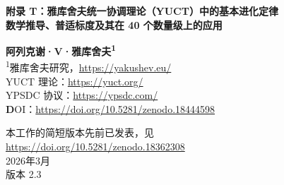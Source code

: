 \documentclass[12pt,a4paper]{article}
\theoremstyle{remark}
\newcommand{\Keff}{K_{\mathrm{eff}}}
\newcommand{\kappac}{\kappa_c}
\newcommand{\eps}{\varepsilon}
\begin{document}
	
	\begin{titlepage}
		\begin{center}
			\vspace*{1cm}
			
			\Huge\textbf{附录 T：雅库舍夫统一协调理论（YUCT）中的基本进化定律} \\
			\vspace{0.5cm}
			\Large\textbf{数学推导、普适标度及其在 40 个数量级上的应用}
			
			\vspace{1.5cm}
			
			\Large\textbf{阿列克谢·V·雅库舍夫\textsuperscript{1}} \\
			
			\vspace{0.3cm}
			\large
			\textsuperscript{1}雅库舍夫研究，\url{https://yakushev.eu/} \\
			
			\vspace{1cm}
			\large
			YUCT 理论：\url{https://yuct.org/}\\
			YPSDC 协议：\url{https://ypsdc.com/}\\
			
			\vspace{2cm}
			\textbf DOI：\url{https://doi.org/10.5281/zenodo.18444598}\\
			
			\vspace{1cm}
			
			\vspace{0cm}
			\large 
			本工作的简短版本先前已发表，见\\ \url{https://doi.org/10.5281/zenodo.18362308}\\
			\vspace{1cm}
			2026年3月 \\ \large 版本 2.3
			
			\vspace{2cm}
			
			\begin{minipage}{0.9\textwidth}
				\begin{abstract}
					\noindent
					本附录给出了雅库舍夫统一协调理论（YUCT）中基本进化定律的完整数学表述。我们证明，从分子系统到星系结构的所有尺度上的进化都受协调效率 $\Keff$ 的优化所支配。从 YUCT 的第一原理出发，我们推导了普适误差标度律 $\eps = \kappac \alpha \Keff^{-\beta}$，其中 $\beta = 0.67 \pm 0.03$，$\kappac = 0.33$，该定律在 40 个数量级上成立。这一定律决定了 DNA 中的突变率、社会崩溃的概率、星系旋转曲线和宇宙学参数。我们引入了基本进化方程 $\partial_t K = rK(1-K/K_{\mathrm{opt}}) - \mu K \eps(K) + D\nabla^2 K + \xi(t)$，并将其应用于：（1）细菌和脊椎动物的遗传进化，（2）物种形成动力学，（3）社会系统和帝国崩溃，（4）宇宙暴胀和结构形成，（5）核链式反应，以及（6）生命起源。该理论给出了与独立数据（白矮星红移、GRACE 卫星异常、地月潮汐演化以及 68 个脊椎动物物种的基因组突变率）定量一致的预测。我们证明生命涌现的临界协调阈值为 $K_{\mathrm{crit}} \approx 150$，这解释了生命在早期地球上的快速出现。
					

\end{abstract}
\end{minipage}
\end{center}
\end{titlepage}
\end{document}
